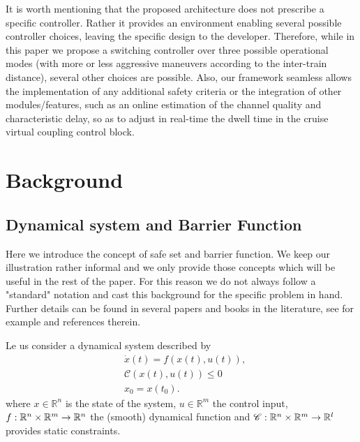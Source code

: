 \documentclass[letterpaper, 10 pt, conference]{ieeeconf}
\theoremstyle{definition}
\theoremstyle{nopoint}
\begin{document}
It is worth mentioning that the proposed architecture does not prescribe a specific controller. Rather it provides an environment enabling several possible controller choices, leaving the specific design to the developer. 
Therefore, while in this paper we propose a switching controller over three possible operational modes (with more or less aggressive maneuvers according to the inter-train distance), several other choices are possible. 
Also, our framework seamless allows the implementation of any additional safety criteria or the integration of other modules/features, such as an online estimation of the channel quality and characteristic delay, so as to adjust in real-time the dwell time in the cruise virtual coupling control block. 






\section{Background}
 \label{sec:Background}
 





\subsection{Dynamical system and Barrier Function}
\label{subsec:barrier}

Here we introduce the concept of safe set and barrier function. We keep our illustration rather informal and we only provide those concepts which will be useful in the rest of the paper. For this reason we do not always follow a "standard" notation and cast this background for the specific problem in hand.  Further details can be found in several papers and books in the literature, see for example \cite{belta} and references therein. 


Le us consider a dynamical system described by 
\begin{subequations}\label{eq:dynamical_system}
\begin{align}
	& \dot{x}(t) = f(x(t), u(t)), \label{eq:dynamics}\\
	& \mathcal{C}(x(t),u(t))\leq 0 \label{eq:constraints}\\
	& x_0=x(t_0). \label{eq:initial_condition}
\end{align}
\end{subequations}
where \(x \in \mathbb{R}^n\) is the state of the system, \(u \in \mathbb{R}^m\) the control input, $f: \Bbb{R}^n \times\Bbb{R}^m \rightarrow \Bbb{R}^n $ the (smooth) dynamical function and $\mathcal{C}: \Bbb{R}^n \times\Bbb{R}^m \rightarrow \Bbb{R}^l$ provides static constraints. 
\end{document}
